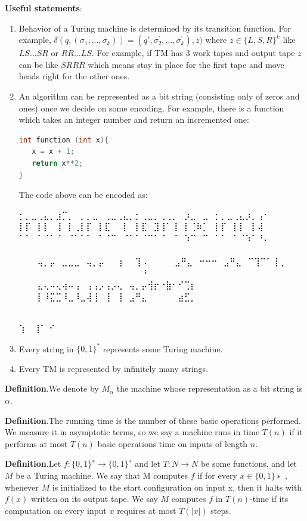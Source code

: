 \documentclass[a4paper,12pt]{article}
\begin{document}
\textbf{Useful statements}:
\begin{enumerate}
\item Behavior of a Turing machine is determined by its transition function. For example,
$\delta(q, (\sigma_1, \dots, \sigma_k)) = (q', \sigma^{'}_2, \dots, \sigma^{'}_k), z) $ where $z \in \{L, S, R\}^{k}$ like $LS\dots SR$ or $RR\dots LS$. For example, if TM has 3 work tapes and output tape $z$ can be like $SRRR$ which means stay in place for the first tape and move heads right for the other ones. 
\item  An algorithm can be represented as a bit string (consisting only of zeros and ones) once we decide on some encoding. For example, there is a function which takes an integer number and return an incremented one:
\begin{lstlisting}[language=C]
int function (int x){
   x = x + 1; 
   return x**2; 
}
\end{lstlisting}

The code above can be encoded as:
{\obeylines\braille
⡂⡀⣀⢀⣄⡀⣰⡉⡀⠀⡀⡀⣀⠀⢀⣀⢀⣄⡀⡂⢀⣀⡀⢀⢀⡀⠀⡰⣀⠀⣀⠀⡂⡀⣀⢀⣄⡰⡀⢠⠂
⡇⡏⠀⡇⡇⠀⢸⠀⡇⢀⡇⡏⠀⡇⣏⠀⠀⡇⠀⡇⣏⠀⣹⢸⠁⢸⠀⡇⢈⠷⡁⠀⡇⡏⠀⡇⡇⠀⡇⢼⠀
⠁⠁⠀⠁⠈⠁⠈⠀⠈⠁⠁⠁⠀⠁⠈⠉⠀⠈⠁⠁⠈⠉⠁⠈⠀⠈⠀⠱⠉⠀⠉⠀⠁⠁⠀⠁⠈⠱⠁⠘⠄
⠀⠀⠀⠀⠀⠀⠀⠀⠀⠀⠀⠀⠀⠀⠀⠀⠀⠀⠀⠀⠀⠀⠀⠀⠀⠀⠀⠀⠀⠀⠀⠀⠀⠀⠀⠀⠀⠀⠀⠀⠀
⠀⠀⠀⢤⡀⡤⠀⣀⣀⣀⠀⢤⡀⡤⠀⠀⢰⠀⠀⢹⠠⠀
⠀⠀⠀⣠⠛⣄⠀⠒⠒⠒⠀⣠⠛⣄⠀⠉⢹⠉⠁⢸⢀⠀
⠀⠀⠀⠀⠀⠀⠀⠀⠀⠀⠀⠀⠀⠀⠀⠀⠀⠀⠀⠀⠘⠀
⠀⠀⠀⣄⢄⠤⢄⢴⠤⢠⠀⢠⢠⡠⢠⡠⢄⠀⢤⡀⡤⢺⡖⠐⣷⠂⠊⢉⡆
⠀⠀⠀⡇⠸⣍⣉⠸⣀⠸⣀⢼⢸⠀⢸⠀⢸⠀⣠⠛⣄⠀⠀⠀⠀⠀⣴⣋⡀
⠀⠀⠀⠀⠀⠀⠀⠀⠀⠀⠀⠀⠀⠀⠀⠀⠀⠀⠀⠀⠀⠀⠀⠀⠀⠀⠀⠀⠀

⢱⠀
⢸⠁
⠊
}
\item Every string in $\{0, 1\}^{*}$ represents some Turing machine.
\item Every TM is represented by infinitely many strings.
\end{enumerate}

\textbf{Definition}.We denote by $M_\alpha$ the machine whose representation as a bit string is $\alpha$. 

\textbf{Definition}.The running time is the number of these basic operations performed. We
measure it in asymptotic terms, so we say a machine runs in time $T(n)$ if it performs at
most $T(n)$ basic operations time on inputs of length $n$.

\textbf{Definition}.Let $f : \{0, 1\}^∗ → \{0, 1\}^∗$ and let $T : N → N$ be some functions, and let $M$ be a Turing
machine. We say that M computes $f$ if for every $x ∈ \{0, 1\}∗$ , whenever $M$ is initialized
to the start configuration on input x, then it halts with $f(x)$ written on its output tape.
We say $M$ computes $f$ in $T(n)$-time if its computation on every input $x$ requires at
most $T(|x|)$ steps.
\end{document}
